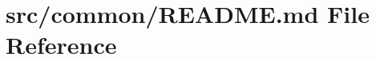 \hypertarget{src_2common_2README_8md}{}\section{src/common/\+R\+E\+A\+D\+ME.md File Reference}
\label{src_2common_2README_8md}
